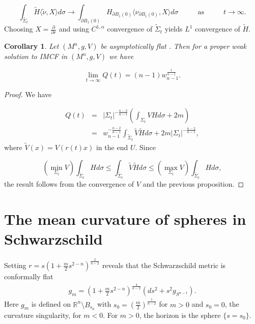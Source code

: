 \documentclass[12pt,twoside]{article}
\theoremstyle{plain}
\newtheorem{cor}[theorem]{Corollary}
\theoremstyle{definition}
\theoremstyle{remark}
\newcommand{\lt}{\left}
\newcommand{\rt}{\right}
\newcommand{\R}{\mathbb{R}}
\numberwithin{equation}{section}
\begin{document}
\begin{equation*}
    \int_{\widetilde{\Sigma_{t}}} \widetilde{H} \langle \widetilde{\nu}, X \rangle d\sigma \rightarrow \int_{\partial B_{1}(0)} H_{\partial B_{1}(0)} \langle \nu_{\partial B_{1}(0)}, X \rangle d\sigma \hspace{1cm} \text{ as  } \hspace{1cm} t \rightarrow \infty.
\end{equation*}
Choosing $X=\frac{\partial}{\partial r}$ and using $C^{1,\alpha}$ convergence of $\widetilde{\Sigma}_{t}$ yields $L^{1}$ convergence of $\widetilde{H}$.  
\begin{cor} \label{convergence}
Let $(M^{n},g,V)$ be asymptotically flat . Then for a proper weak solution to IMCF in $(M^{n},g,V)$ we have

\begin{equation*}
    \lim_{t \rightarrow \infty} Q(t) = (n-1)w_{n-1}^{\frac{1}{n-1}}.
\end{equation*}
\end{cor}

\begin{proof}
We have

\begin{eqnarray}
    Q(t) &=& |\Sigma_{t}|^{-\frac{n-2}{n-1}} \left( \int_{\Sigma_{t}} V H d\sigma + 2m \right) \\
    &=& w_{n-1}^{-\frac{n-2}{n-1}} \int_{\widetilde{\Sigma}_{t}} \widetilde{V} \widetilde{H} d\sigma + 2m |\Sigma_{t}|^{-\frac{n-2}{n-1}}, \nonumber
\end{eqnarray}
where $\widetilde{V}(x)= V(r(t) x)$ in the end $U$. Since

\begin{equation*}
    \left( \min_{\Sigma_{t}} V  \right) \int_{\widetilde{\Sigma}_{t}} H d\sigma \leq \int_{\widetilde{\Sigma}_{t}} \widetilde{V} \widetilde{H} d\sigma \leq \left( \max_{\Sigma_{t}} V \right) \int_{\widetilde{\Sigma}_{t}} H d\sigma,
\end{equation*}
the result follows from the convergence of $V$ and the previous proposition.
\end{proof}

\section{The mean curvature of spheres in Schwarzschild}
Setting $r = s (1 + \frac{m}{2} s^{2-n})^{\frac{2}{n-2}}$ reveals that the Schwarzschild metric is conformally flat
\begin{align*}
g_m = \lt( 1 + \frac{m}{2} s^{2-n}\rt)^{\frac{4}{n-2}} (ds^2 + s^2 g_{S^{n-1}}).
\end{align*}
Here $g_m$ is defined on $\R^n \setminus B_{s_0}$ with $s_0 = \lt( \frac{m}{2}\rt)^{\frac{1}{n-2}}$ for $m > 0$ and $s_0 =0$, the curvature singularity, for $m < 0$. For $m > 0$, the horizon is the sphere $\{ s = s_0\}$.
\end{document}
